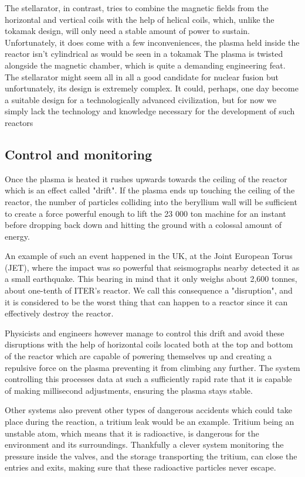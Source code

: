 \documentclass[11pt, openright]{book}
\begin{document}
\tab The stellarator, in contrast, tries to combine the magnetic fields from the horizontal and vertical coils with the help of helical coils, which, unlike the tokamak design, will only need a stable amount of power to sustain. Unfortunately, it does come with a few inconveniences, the plasma held inside the reactor isn't cylindrical as would be seen in a tokamak The plasma is twisted alongside the magnetic chamber, which is quite a demanding engineering feat. The stellarator might seem all in all a good candidate for nuclear fusion but unfortunately, its design is extremely complex. It could, perhaps, one day become a suitable design for a technologically advanced civilization, but for now we simply lack the technology and knowledge necessary for the development of such reactors

\subsection{Control and monitoring}

\tab Once the plasma is heated it rushes upwards towards the ceiling of the reactor which is an effect called "drift". If the plasma ends up touching the ceiling of the reactor, the number of particles colliding into the beryllium wall will be sufficient to create a force powerful enough to lift the 23 000 ton machine for an instant before dropping back down and hitting the ground with a colossal amount of energy.

\tab An example of such an event happened in the UK, at the Joint European Torus (JET), where the impact was so powerful that seismographs nearby detected it as a small earthquake. This bearing in mind that it only weighs about  2,600 tonnes, about one-tenth of ITER's reactor. We call this consequence a "disruption", and it is considered to be the worst thing that can happen to a reactor since it can effectively destroy the reactor.

\tab Physicists and engineers however manage to control this drift and avoid these disruptions with the help of horizontal coils located both at the top and bottom of the reactor which are capable of powering themselves up and creating a repulsive force on the plasma preventing it from climbing any further. The system controlling this processes data at such a sufficiently rapid rate that it is capable of making millisecond adjustments, ensuring the plasma stays stable.

\tab Other systems also prevent other types of dangerous accidents which could take place during the reaction, a tritium leak would be an example. Tritium being an unstable atom, which means that it is radioactive, is dangerous for the environment and its surroundings. Thankfully a clever system monitoring the pressure inside the valves, and the storage transporting the tritium, can close the entries and exits, making sure that these radioactive particles never escape.
\end{document}
